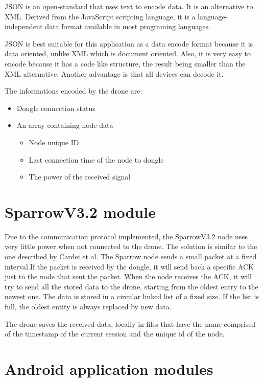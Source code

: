 JSON \cite{json} is an open-standard that uses text to encode data. It is an alternative to XML. Derived from the JavaScript scripting language, it is a language-independent data format available in most programing languages.

JSON is best suitable for this application as a data encode format because it is data oriented, unlike XML which is document oriented. Also, it is very easy to encode because it has a code like structure, the result being smaller than the XML alternative. Another advantage is that all devices can decode it. 

The informations encoded by the drone are:
\begin{itemize}

\item Dongle connection status
\item An array containing node data
\begin{itemize}
‏
	\item Node unique ID
	\item Last connection time of the node to dongle
	\item The power of the received signal

	\end{itemize}
\end{itemize}
 

\section{SparrowV3.2 module}

Due to the communication protocol implemented, the SparrowV3.2 node uses very little power when not connected to
the drone. The solution is similar to the one described by Cardei et al\cite{cardei2005improving}. The Sparrow node sends a small packet at a fixed interval.If the packet is received by the dongle, it will send back a specific ACK just to the node that sent the packet. When the node receives the ACK, it will try to send all the stored data to the drone, starting from the oldest entry to the newest one. The data is stored in a circular linked list of a fixed size. If the list is full, the oldest entity is always replaced by new data.

The drone saves the received data, locally in files that have the name comprised of the timestamp of the current session and the unique id of the node.

\section{Android application modules}
 
